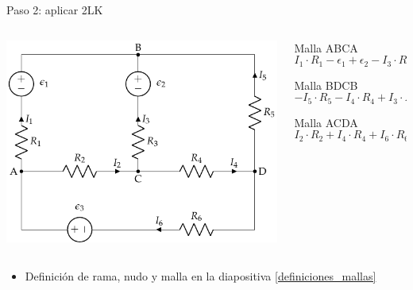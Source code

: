 \documentclass[aspectratio=169, xcolor={usenames,svgnames,dvipsnames}]{beamer}
\begin{document}
\begin{frame}{Paso 2: aplicar 2LK}
    \begin{columns}
    \begin{column}{0.5\columnwidth}
    \begin{center}
    \includegraphics[width=.9\linewidth]{../figs/mallas1.pdf}
    \end{center}
    \end{column}
    
    \begin{column}{0.5\columnwidth}
    Malla ABCA
    \begin{equation*}
      I_1 \cdot R_1 - \epsilon_1 + \epsilon_2 - I_3 \cdot R_3 - I_2 \cdot R_2 = 0
    \end{equation*}
    
    Malla BDCB
    \begin{equation*}
      -I_5 \cdot R_5 - I_4 \cdot R_4 + I_3 \cdot R_3 - \epsilon_2 = 0
    \end{equation*}
    
    Malla ACDA
    \begin{equation*}
      I_2 \cdot R_2 + I_4 \cdot R_4 + I_6 \cdot R_6 - \epsilon_3 = 0
    \end{equation*}
    \end{column}
    \end{columns}

    \begin{center}
    \end{center}
    \vspace{-10pt} 
    \begin{itemize}\addtolength{\itemindent}{12mm}
        \item Definición de \alert{rama}, \alert{nudo} y \alert{malla} en la diapositiva \ref{definiciones_mallas}
    \end{itemize}
\end{frame}
\end{document}
